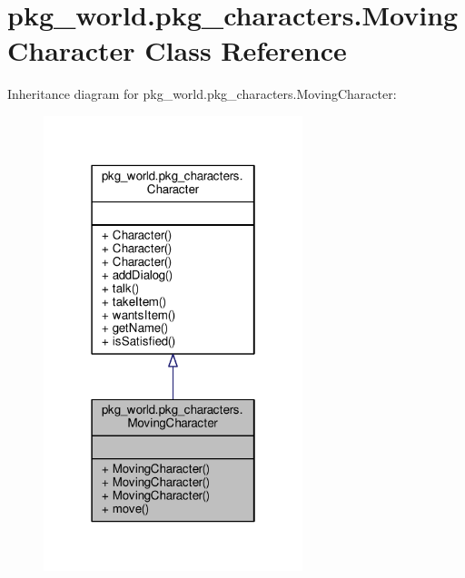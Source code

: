 \hypertarget{classpkg__world_1_1pkg__characters_1_1MovingCharacter}{\section{pkg\-\_\-world.\-pkg\-\_\-characters.\-Moving\-Character Class Reference}
\label{classpkg__world_1_1pkg__characters_1_1MovingCharacter}
}


Inheritance diagram for pkg\-\_\-world.\-pkg\-\_\-characters.\-Moving\-Character\-:
\nopagebreak
\begin{figure}[H]
\begin{center}
\leavevmode
\includegraphics[width=214pt]{classpkg__world_1_1pkg__characters_1_1MovingCharacter__inherit__graph}
\end{center}
\end{figure}


